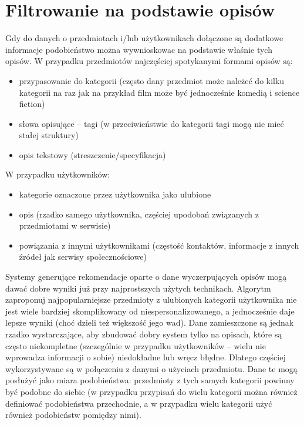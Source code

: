 \documentclass{pracamgr}
\begin{document}
  \section{Filtrowanie na podstawie opisów} %
   Gdy do danych o przedmiotach i/lub użytkownikach dołączone są dodatkowe informacje podobieństwo
   można wywnioskowac na podstawie właśnie tych opisów.\newline
   W przypadku przedmiotów najczęściej spotykanymi formami opisów są:
   \begin{itemize}\itemsep1pt \parskip0pt 
    \item przypasowanie do kategorii
     (często dany przedmiot może należeć do kilku kategorii na raz jak na przykład film może być jednocześnie komedią i science fiction)
    \item słowa opisujące -- tagi (w przeciwieństwie do kategorii tagi mogą nie mieć stałej struktury)
    \item opis tekstowy (streszczenie/specyfikacja)
   \end{itemize}
   W przypadku użytkowników:
   \begin{itemize}\itemsep1pt \parskip0pt 
    \item kategorie oznaczone przez użytkownika jako ulubione
    \item opis (rzadko samego użytkownika, częściej upodobań związanych z przedmiotami w serwisie)
    \item powiązania z innymi użytkownikami (częstość kontaktów, informacje z innych źródeł jak serwisy społecznościowe)
   \end{itemize}
   Systemy generujące rekomendacje oparte o dane wyczerpujących opisów mogą dawać dobre wyniki już przy najprostszych użytych technikach.
   Algorytm zaproponuj najpopularniejsze przedmioty z ulubionych kategorii użytkownika nie jest wiele bardziej skomplikowany od niespersonalizowanego,
   a jednocześnie daje lepsze wyniki (choć dzieli też większość jego wad).
   Dane zamieszczone są jednak rzadko wystarczające, aby zbudować dobry system tylko na opisach, które są często niekompletne
   (szczególnie w przypadku użytkowników -- wielu nie wprowadza informacji o sobie) niedokładne lub wręcz błędne.
   Dlatego częściej wykorzystywane są w połączeniu z danymi o użyciach przedmiotu. Dane te mogą posłużyć jako miara podobieństwa:
   przedmioty z tych samych kategorii powinny być podobne do siebie
   (w przypadku przypisań do wielu kategorii można również definiować podobieństwa przechodnie,
   a w przypadku wielu kategorii użyć również podobieństw pomiędzy nimi).
\end{document}
